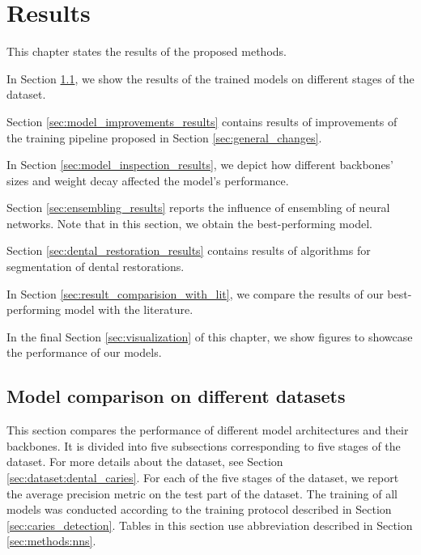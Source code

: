 \chapter{Results}
\label{chapter:results}
This chapter states the results of the proposed methods.

\medskip In Section \ref{sec:model_comparison}, we show the results of the trained models on different stages of the dataset.

\medskip Section \ref{sec:model_improvements_results} contains results of improvements of the training pipeline proposed in Section \ref{sec:general_changes}.

\medskip In Section \ref{sec:model_inspection_results}, we depict how different backbones' sizes and weight decay affected the model's performance.

\medskip Section \ref{sec:ensembling_results} reports the influence of ensembling of neural networks. Note that in this section, we obtain the best-performing model.

\medskip Section \ref{sec:dental_restoration_results} contains results of algorithms for segmentation of dental restorations.

\medskip In Section \ref{sec:result_comparision_with_lit}, we compare the results of our best-performing model with the literature.

\medskip In the final Section \ref{sec:visualization} of this chapter, we show figures to showcase the performance of our models.

\section{Model comparison on different datasets}
\label{sec:model_comparison}
This section compares the performance of different model architectures and their backbones. It is divided into five subsections corresponding to five stages of the dataset. For more details about the dataset, see Section \ref{sec:dataset:dental_caries}. For each of the five stages of the dataset, we report the average precision metric on the test part of the dataset. The training of all models was conducted according to the training protocol described in Section \ref{sec:caries_detection}. Tables in this section use abbreviation described in Section \ref{sec:methods:nns}.

